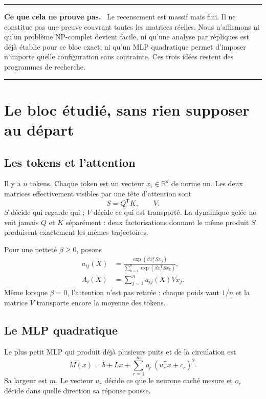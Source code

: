 \documentclass[11pt,a4paper]{article}
\theoremstyle{definition}
\newcommand{\R}{\mathbb R}
\newcommand{\T}{\mathsf T}
\newenvironment{limitbox}
{\begin{center}\begin{minipage}{0.92\textwidth}\color{deeporange}\hrule\vspace{0.45em}\small\textbf{Ce que cela ne prouve pas.}\ \color{black}}
{\vspace{0.35em}\color{deeporange}\hrule\color{black}\end{minipage}\end{center}}
\begin{document}
\begin{limitbox}
Le recensement est massif mais fini. Il ne constitue pas une preuve couvrant toutes les
matrices réelles. Nous n'affirmons ni qu'un problème NP-complet devient facile, ni
qu'une analyse par répliques est déjà établie pour ce bloc exact, ni qu'un MLP
quadratique permet d'imposer n'importe quelle configuration sans contrainte. Ces trois
idées restent des programmes de recherche.
\end{limitbox}

\section{Le bloc étudié, sans rien supposer au départ}
\label{sec:model}

\subsection{Les tokens et l'attention}

Il y a $n$ tokens. Chaque token est un vecteur $x_i\in\R^d$ de norme un. Les deux
matrices effectivement visibles par une tête d'attention sont
\[
 S=Q^{\T}K,\qquad V.
\]
$S$ décide qui regarde qui ; $V$ décide ce qui est transporté. La dynamique gelée ne
voit jamais $Q$ et $K$ séparément : deux factorisations donnant le même produit $S$
produisent exactement les mêmes trajectoires.

Pour une netteté $\beta\ge0$, posons
\begin{align}
 a_{ij}(X)&=\frac{\exp(\beta x_i^{\T}Sx_j)}
 {\sum_{k=1}^n\exp(\beta x_i^{\T}Sx_k)},\label{eq:weights}\\
 A_i(X)&=\sum_{j=1}^n a_{ij}(X)Vx_j.\label{eq:attention}
\end{align}
Même lorsque $\beta=0$, l'attention n'est pas retirée : chaque poids vaut $1/n$ et la
matrice $V$ transporte encore la moyenne des tokens.

\subsection{Le MLP quadratique}

Le plus petit MLP qui produit déjà plusieurs puits et de la circulation est
\begin{equation}
 M(x)=b+Lx+\sum_{r=1}^{m}o_r\,(u_r^{\T}x+c_r)^2.\label{eq:general-mlp}
\end{equation}
Sa largeur est $m$. Le vecteur $u_r$ décide ce que le neurone caché mesure et $o_r$
décide dans quelle direction sa réponse pousse.
\end{document}
